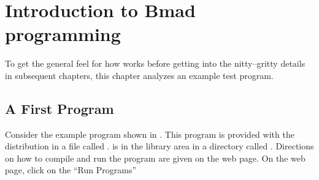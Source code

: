 \chapter{Introduction to Bmad programming}
\label{c:program.info}

To get the general feel for how \bmad works before
getting into the nitty--gritty details in subsequent chapters, this
chapter analyzes an example test program.

\section{A First Program}
\label{s:first.program}

Consider the example program shown in .  This program
is provided with the \bmad distribution in a file called
.  is in the
library area in a directory called
. Directions on how to compile and
run the program are given on the \bmad web page\cite{b:bmad.web}. On
the \bmad web page, click on the ``Run Programs''

